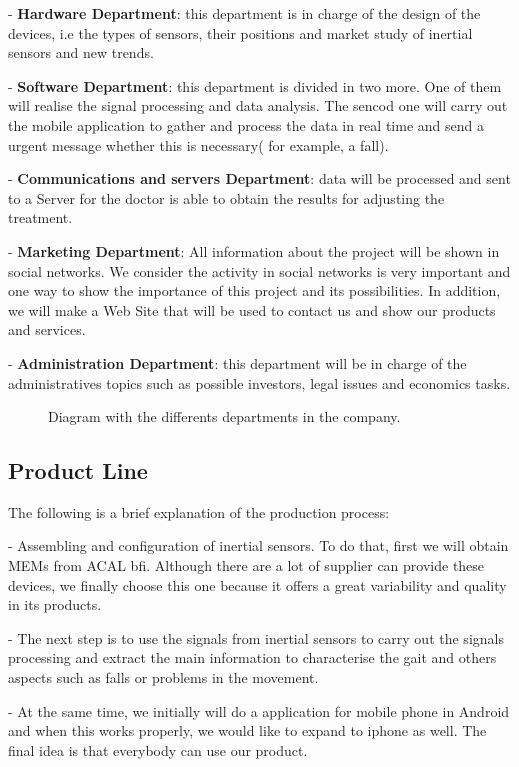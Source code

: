 -	\textbf{Hardware Department}: this department is in charge of the design of the devices, i.e the types of sensors, their  positions  and market study of inertial sensors and new trends.

-	\textbf{Software Department}: this department is divided in two more. One of them will realise the signal processing and data analysis. The sencod one will carry out the mobile application to gather and process the data in real time and send a urgent message whether this is necessary( for example, a fall).

-	\textbf{Communications and servers Department}: data will be processed and sent to a Server for the doctor is able to obtain the results for adjusting the treatment.

-	\textbf{Marketing Department}: All information about the project will be shown in  social networks. We consider the activity in social networks is very important and one way to show the importance of this project and its possibilities.
In addition, we will make a Web Site that will be used to contact us and show our products and services.

-	\textbf{Administration Department}: this department will be in charge of the administratives topics such as possible investors, legal issues and economics tasks.

\begin{figure}[H]
	\centering
	\caption{Diagram with the differents departments in the company.}
	\label{fig:Deparments}
\end{figure}

\subsection{Product Line}
The following is a brief explanation of the production process:

-	Assembling and configuration of inertial sensors. To do that, first we will obtain MEMs from ACAL bfi. Although there are a lot of supplier can provide these devices, we finally choose this one because it offers a great variability and quality in its products.

-	The next step is to use the signals from inertial sensors to carry out the signals processing and extract the main information to characterise the gait and others aspects such as falls or problems in the movement.

-	At the same time, we initially will do a application for mobile phone in Android and when this works properly, we would like to expand to iphone as well. The final idea is that everybody can use our product.

